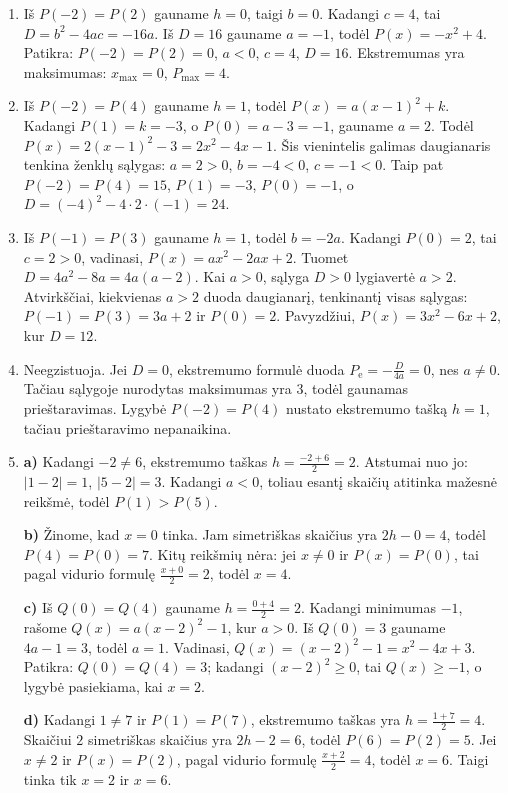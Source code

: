 \documentclass[12pt,a4paper]{article}
\begin{document}
\begin{enumerate}
\item Iš $P(-2)=P(2)$ gauname $h=0$, taigi $b=0$. Kadangi $c=4$, tai $D=b^2-4ac=-16a$. Iš $D=16$ gauname $a=-1$, todėl $P(x)=-x^2+4$. Patikra: $P(-2)=P(2)=0$, $a<0$, $c=4$, $D=16$. Ekstremumas yra maksimumas: $x_{\max}=0$, $P_{\max}=4$.
\item Iš $P(-2)=P(4)$ gauname $h=1$, todėl $P(x)=a(x-1)^2+k$. Kadangi $P(1)=k=-3$, o $P(0)=a-3=-1$, gauname $a=2$. Todėl $P(x)=2(x-1)^2-3=2x^2-4x-1$. Šis vienintelis galimas daugianaris tenkina ženklų sąlygas: $a=2>0$, $b=-4<0$, $c=-1<0$. Taip pat $P(-2)=P(4)=15$, $P(1)=-3$, $P(0)=-1$, o $D=(-4)^2-4\cdot2\cdot(-1)=24$.
\item Iš $P(-1)=P(3)$ gauname $h=1$, todėl $b=-2a$. Kadangi $P(0)=2$, tai $c=2>0$, vadinasi, $P(x)=ax^2-2ax+2$. Tuomet $D=4a^2-8a=4a(a-2)$. Kai $a>0$, sąlyga $D>0$ lygiavertė $a>2$. Atvirkščiai, kiekvienas $a>2$ duoda daugianarį, tenkinantį visas sąlygas: $P(-1)=P(3)=3a+2$ ir $P(0)=2$. Pavyzdžiui, $P(x)=3x^2-6x+2$, kur $D=12$.
\item Neegzistuoja. Jei $D=0$, ekstremumo formulė duoda $P_{\mathrm e}=-\frac{D}{4a}=0$, nes $a\ne0$. Tačiau sąlygoje nurodytas maksimumas yra $3$, todėl gaunamas prieštaravimas. Lygybė $P(-2)=P(4)$ nustato ekstremumo tašką $h=1$, tačiau prieštaravimo nepanaikina.
\item \textbf{a)} Kadangi $-2\ne6$, ekstremumo taškas $h=\frac{-2+6}{2}=2$. Atstumai nuo jo: $|1-2|=1$, $|5-2|=3$. Kadangi $a<0$, toliau esantį skaičių atitinka mažesnė reikšmė, todėl $P(1)>P(5)$.

\textbf{b)} Žinome, kad $x=0$ tinka. Jam simetriškas skaičius yra $2h-0=4$, todėl $P(4)=P(0)=7$. Kitų reikšmių nėra: jei $x\ne0$ ir $P(x)=P(0)$, tai pagal vidurio formulę $\frac{x+0}{2}=2$, todėl $x=4$.

\textbf{c)} Iš $Q(0)=Q(4)$ gauname $h=\frac{0+4}{2}=2$. Kadangi minimumas $-1$, rašome $Q(x)=a(x-2)^2-1$, kur $a>0$. Iš $Q(0)=3$ gauname $4a-1=3$, todėl $a=1$. Vadinasi, $Q(x)=(x-2)^2-1=x^2-4x+3$. Patikra: $Q(0)=Q(4)=3$; kadangi $(x-2)^2\ge0$, tai $Q(x)\ge-1$, o lygybė pasiekiama, kai $x=2$.

\textbf{d)} Kadangi $1\ne7$ ir $P(1)=P(7)$, ekstremumo taškas yra $h=\frac{1+7}{2}=4$. Skaičiui $2$ simetriškas skaičius yra $2h-2=6$, todėl $P(6)=P(2)=5$. Jei $x\ne2$ ir $P(x)=P(2)$, pagal vidurio formulę $\frac{x+2}{2}=4$, todėl $x=6$. Taigi tinka tik $x=2$ ir $x=6$.
\end{enumerate}
\end{document}
